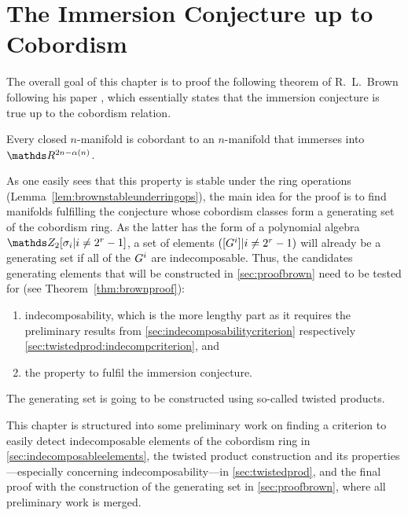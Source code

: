 % 

\chapter{The Immersion Conjecture up to Cobordism}\label{chap:brown}
The overall goal of this chapter is to proof the following theorem of
R.~L.~Brown following his paper \cite{brown},
which essentially states that the immersion conjecture is true up to
the cobordism relation.
\begin{Thm}[Brown]\label{thm:brown}
  Every closed $n$-manifold is cobordant to an $n$-manifold that immerses
  into $\R^{2n-\alpha(n)}$.
\end{Thm}

As one easily sees that this property is stable under
the ring operations (Lemma~\autoref{lem:brownstableunderringops}),
the main idea for the proof is to find manifolds
fulfilling the conjecture whose cobordism classes form a generating set
of the cobordism ring.
As the latter has the form of a polynomial algebra
$\Zmod2[\sigma_i|i\neq 2^r-1]$, a set of elements
$([G^{i}]|i\neq2^r-1)$ will already be a generating set if all of the
$G^{i}$ are indecomposable.
Thus, the candidates generating elements that will be constructed
in \autoref{sec:proofbrown} need to be tested for (see
Theorem~\autoref{thm:brownproof}):
\begin{enumerate}
\item indecomposability, which is the more lengthy part as it
  requires the preliminary results from
  \autoref{sec:indecomposabilitycriterion} respectively
  \autoref{sec:twistedprod:indecompcriterion}, and
\item the property to fulfil the immersion conjecture.
\end{enumerate}
The generating set is going to be constructed using so-called twisted
products.

This chapter is structured into some preliminary work on finding a
criterion to easily detect indecomposable elements of the cobordism
ring in \autoref{sec:indecomposableelements},
the twisted product construction and its properties---especially
concerning indecomposability---in
\autoref{sec:twistedprod}, and the final proof with the construction
of the generating set in \autoref{sec:proofbrown}, where all
preliminary work is merged.

